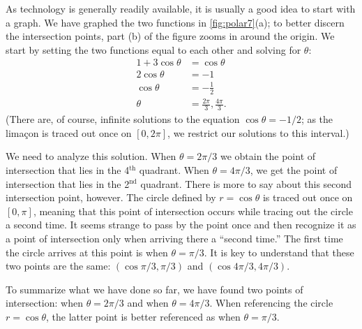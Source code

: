 {As technology is generally readily available, it is usually a good idea to start with a graph. We have graphed the two functions in \autoref{fig:polar7}(a); to better discern the intersection points, part (b) of the figure zooms in around the origin.
We start by setting the two functions equal to each other and solving for $\theta$:
\begin{align*}
1+3\cos\theta &= \cos \theta \\
2\cos\theta &= -1\\
\cos\theta&= -\frac12\\
\theta &= \frac{2\pi}{3}, \frac{4\pi}{3}.
\end{align*}
(There are, of course, infinite solutions to the equation $\cos\theta=-1/2$; as the lima\c con is traced out once on $[0,2\pi]$, we restrict our solutions to this interval.) 

We need to analyze this solution. When $\theta = 2\pi/3$ we obtain the point of intersection that lies in the 4$^\text{th}$ quadrant. When $\theta = 4\pi/3$, we get the point of intersection that lies in the 2$^\text{nd}$ quadrant. There is more to say about this second intersection point, however. The circle defined by $r=\cos\theta$ is traced out once on $[0,\pi]$, meaning that this point of intersection occurs while tracing out the circle a second time. It seems strange to pass by the point once and then recognize it as a point of intersection only when arriving there a ``second time.'' The first time the circle arrives at this point is when $\theta = \pi/3$.
It is key to understand that these two points are the same: $(\cos \pi/3,\pi/3)$ and $(\cos 4\pi/3,4\pi/3)$. 

To summarize what we have done so far, we have found two points of intersection: when $\theta=2\pi/3$ and when $\theta=4\pi/3$. When referencing the circle $r=\cos \theta$, the latter point is better referenced as when $\theta=\pi/3$.

}
